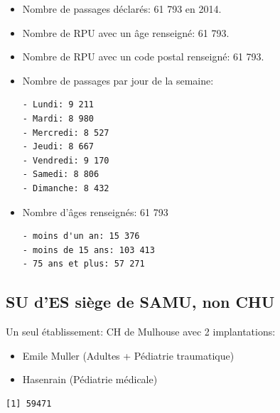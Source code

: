 \documentclass[]{article}
\newenvironment{Shaded}{\begin{snugshade}}{\end{snugshade}}
\newcommand{\KeywordTok}[1]{\textcolor[rgb]{0.13,0.29,0.53}{\textbf{{#1}}}}
\newcommand{\StringTok}[1]{\textcolor[rgb]{0.31,0.60,0.02}{{#1}}}
\newcommand{\CommentTok}[1]{\textcolor[rgb]{0.56,0.35,0.01}{\textit{{#1}}}}
\newcommand{\NormalTok}[1]{{#1}}
\begin{document}
\begin{itemize}
\item
  Nombre de passages déclarés: 61 793 en 2014.
\item
  Nombre de RPU avec un âge renseigné: 61 793.
\item
  Nombre de RPU avec un code postal renseigné: 61 793.
\item
  Nombre de passages par jour de la semaine:

\begin{verbatim}
- Lundi: 9 211
- Mardi: 8 980
- Mercredi: 8 527
- Jeudi: 8 667
- Vendredi: 9 170
- Samedi: 8 806
- Dimanche: 8 432
\end{verbatim}
\item
  Nombre d'âges renseignés: 61 793

\begin{verbatim}
- moins d'un an: 15 376
- moins de 15 ans: 103 413
- 75 ans et plus: 57 271
\end{verbatim}
\end{itemize}

\subsection{SU d'ES siège de SAMU, non
CHU}\label{su-des-siege-de-samu-non-chu}

Un seul établissement: CH de Mulhouse avec 2 implantations:

\begin{itemize}
\itemsep1pt\parskip0pt
\item
  Emile Muller (Adultes + Pédiatrie traumatique)
\item
  Hasenrain (Pédiatrie médicale)
\end{itemize}

\begin{Shaded}
\end{Shaded}

\begin{verbatim}
[1] 59471
\end{verbatim}

\begin{Shaded}
\end{Shaded}
\end{document}
